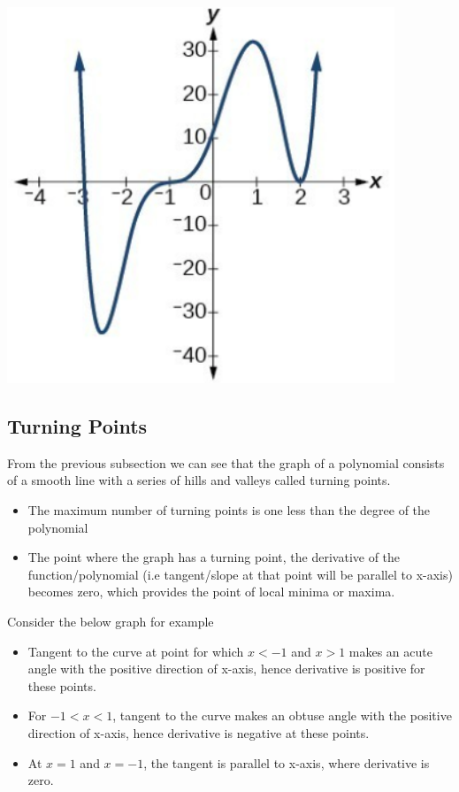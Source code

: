 \documentclass{book}
\begin{document}
	\includegraphics[scale=0.5]{graphex}
	
	\subsection{Turning Points}
	From the previous subsection we can see that the graph of a polynomial consists of a smooth line with a series of hills and valleys called turning points. 
	\begin{itemize}
		\item The maximum number of turning points is one less than the degree of the polynomial
		\item The point where the graph has a turning point, the derivative of the function/polynomial (i.e tangent/slope at that point will be parallel to x-axis) becomes zero, which provides the point of local minima or maxima.
	\end{itemize}
	
	Consider the below graph for example
	
	\begin{itemize}
		
		\item Tangent to the curve at point for which $x < -1$ and $x > 1$ makes an acute angle with the positive direction of x-axis, hence derivative is positive for these points.
		\item For $-1 < x < 1$, tangent to the curve makes an obtuse angle with the positive direction of x-axis, hence derivative is negative at these points.
		\item At $x=1$ and $x=-1$, the tangent is parallel to x-axis, where derivative is zero.
	\end{itemize}
	
\end{document}

